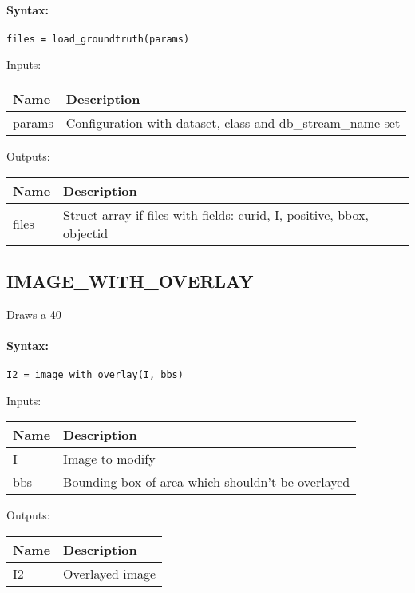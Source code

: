 \paragraph{Syntax:} \verb|files = load_groundtruth(params)|

\bigskip
Inputs:

\begin{tabular}{|p{}|p{}|}
\hline
\textbf{Name} & \textbf{Description} \\
\hline \hline
params & Configuration with dataset, class and db\_stream\_name set  \\ \hline
\end{tabular}

\bigskip
Outputs:

\begin{tabular}{|p{}|p{}|}
\hline
\textbf{Name} & \textbf{Description} \\
\hline \hline
files & Struct array if files with fields: curid, I, positive, bbox, objectid  \\ \hline
\end{tabular}

\subsection{IMAGE\_WITH\_OVERLAY}

Draws a 40%

\paragraph{Syntax:} \verb|I2 = image_with_overlay(I, bbs)|

\bigskip
Inputs:

\begin{tabular}{|p{}|p{}|}
\hline
\textbf{Name} & \textbf{Description} \\
\hline \hline
I & Image to modify  \\ \hline
bbs & Bounding box of area which shouldn't be overlayed  \\ \hline
\end{tabular}

\bigskip
Outputs:

\begin{tabular}{|p{}|p{}|}
\hline
\textbf{Name} & \textbf{Description} \\
\hline \hline
I2 & Overlayed image  \\ \hline
\end{tabular}

